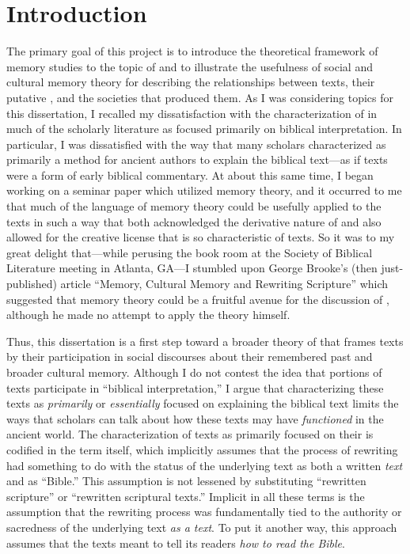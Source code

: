 
\chapter*{Introduction}


The primary goal of this project is to introduce the theoretical framework of memory studies to the topic of \rwb and to illustrate the usefulness of social and cultural memory theory for describing the relationships between \rwb texts, their putative \vorlagen, and the societies that produced them. As I was considering topics for this dissertation, I recalled my dissatisfaction with the characterization of \rwb in much of the scholarly literature as focused primarily on biblical interpretation. In particular, I was dissatisfied with the way that many scholars characterized \rwb as primarily a method for ancient authors to explain the biblical text---as if \rwb texts were a form of early biblical commentary. At about this same time, I began working on a seminar paper which utilized memory theory, and it occurred to me that much of the language of memory theory could be usefully applied to the \rwb texts in such a way that both acknowledged the derivative nature of \rwb and also allowed for the creative license that is so characteristic of \rwb texts. So it was to my great delight that---while perusing the book room at the Society of Biblical Literature meeting in Atlanta, GA---I stumbled upon George Brooke's (then just-published) article ``Memory, Cultural Memory and Rewriting Scripture'' which suggested that memory theory could be a fruitful avenue for the discussion of \rwb, although he made no attempt to apply the theory himself.%
    \autocite{brooke_zsengeller2014}

Thus, this dissertation is a first step toward a broader theory of \rwb that frames \rwb texts by their participation in social discourses about their remembered past and broader cultural memory. Although I do not contest the idea that portions of \rwb texts participate in ``biblical interpretation,'' I argue that characterizing these texts as \emph{primarily} or \emph{essentially} focused on explaining the biblical text limits the ways that scholars can talk about how these texts may have \emph{functioned} in the ancient world. The characterization of \rwb texts as primarily focused on their \vorlagen is codified in the term \rwb itself, which implicitly assumes that the process of rewriting had something to do with the status of the underlying text as both a written \emph{text} and as ``Bible.'' This assumption is not lessened by substituting ``rewritten scripture'' or ``rewritten scriptural texts.'' Implicit in all these terms is the assumption that the rewriting process was fundamentally tied to the authority or sacredness of the underlying text \emph{as a text}. To put it another way, this approach assumes that the \rwb texts meant to tell its readers \emph{how to read the Bible}.

